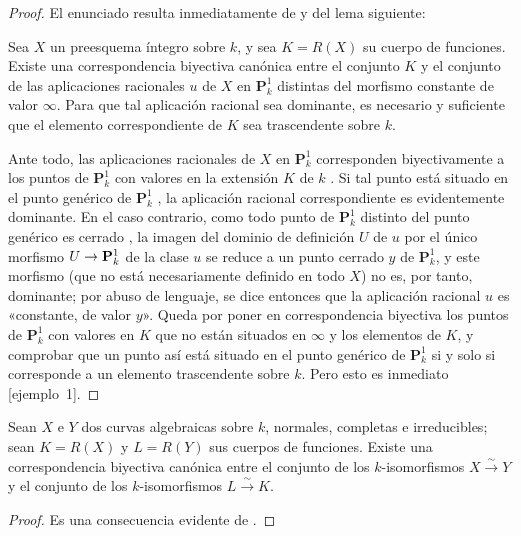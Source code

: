 \documentclass[oneside,10pt]{amsart}
\makeatletter
\newcommand{\ega@arrow}[2]{\mathchoice{#1}{#2}{#2}{#2}}
\renewcommand{\to}{\ega@arrow{\longrightarrow}{\rightarrow}}
\newcommand{\oldpage}[2][]{\marginnote{\normalfont\footnotesize\textbf{#1}~|~#2}\ignorespaces}
\let\EGAOriginalLabel\label
\renewcommand{\label}[1]{\phantomsection\EGAOriginalLabel{#1}}
\makeatother
\begin{document}
\begin{proof}
El enunciado resulta inmediatamente de  y del lema siguiente:
\begin{lemma}[7.4.15.1]
\label{II.7.4.15.1-fr}
Sea $X$ un preesquema íntegro sobre $k$, y sea $K=R(X)$ su cuerpo de funciones.
Existe una correspondencia biyectiva canónica entre el conjunto $K$ y el conjunto de las aplicaciones racionales $u$ de $X$ en $\mathbf{P}_k^1$ distintas del morfismo constante de valor $\infty$.
Para que tal aplicación racional sea dominante, es necesario y suficiente que el elemento correspondiente de $K$ sea trascendente sobre $k$.
\end{lemma}
Ante todo, las aplicaciones racionales de $X$ en $\mathbf{P}_k^1$ corresponden biyectivamente a los puntos de $\mathbf{P}_k^1$ con valores en la extensión $K$ de $k$ .
Si tal punto está situado en el punto genérico de $\mathbf{P}_k^1$ , la aplicación racional correspondiente es evidentemente dominante.
En el caso contrario, como todo punto de $\mathbf{P}_k^1$ distinto del punto genérico es cerrado , la imagen del dominio de definición $U$ de $u$ por el único morfismo $U\to\mathbf{P}_k^1$ de la clase $u$  se reduce a un punto cerrado $y$ de $\mathbf{P}_k^1$, y este morfismo (que no está necesariamente definido en todo $X$) no es, por tanto, dominante;
por abuso de lenguaje, se dice entonces que la aplicación racional $u$ es «constante, de valor $y$».
Queda por poner en correspondencia biyectiva los puntos de $\mathbf{P}_k^1$ con valores en $K$ que no están situados en $\infty$  y los elementos de $K$, y comprobar que un punto así está situado en el punto genérico de $\mathbf{P}_k^1$ si y solo si corresponde a un
\oldpage[II]{152}
elemento trascendente sobre $k$.
Pero esto es inmediato [ejemplo~1].
\end{proof}

\begin{corollary}[7.4.16]
\label{II.7.4.16-fr}
Sean $X$ e $Y$ dos curvas algebraicas sobre $k$, \textup{normales, completas} e irreducibles;
sean $K=R(X)$ y $L=R(Y)$ sus cuerpos de funciones.
Existe una correspondencia biyectiva canónica entre el conjunto de los $k$-isomorfismos $X\xrightarrow{\sim}Y$ y el conjunto de los $k$-isomorfismos $L\xrightarrow{\sim}K$.
\end{corollary}

\begin{proof}
Es una consecuencia evidente de .
\end{proof}
\end{document}
